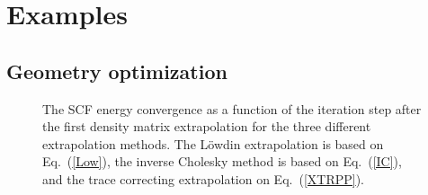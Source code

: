\documentclass[twocolumn,showpacs,preprintnumbers,amsmath,amssymb]{revtex4}
\begin{document}
\section{Examples}\label{EX}

\subsection{Geometry optimization}

\begin{figure}[t]
\caption{\label{FigCaffeine}
The SCF energy convergence as a function of the iteration step
after the first density matrix extrapolation for the three different extrapolation methods.
The L\"{o}wdin extrapolation is based on Eq.\ (\ref{Low}), the inverse Cholesky
method is based on Eq.\ (\ref{IC}), and the trace correcting extrapolation on Eq.\ (\ref{XTRPP}).}
\end{figure}
\end{document}
